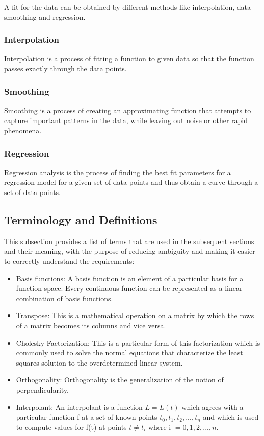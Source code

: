 \documentclass[12pt]{article}
\begin{document}
A fit for the data can be obtained by different methods like interpolation, data smoothing and regression.

\subsubsection{Interpolation}
Interpolation is a process of fitting a function to given data so that the function passes exactly through the data points.

\subsubsection{Smoothing}
Smoothing is a process of creating an approximating function that attempts to capture important patterns in the data, while leaving out noise or other rapid phenomena.

\subsubsection{Regression}
Regression analysis is the process of finding the best fit parameters for a regression model for a given set of data points and thus obtain a curve through a set of data points.

\subsection{Terminology and  Definitions}\label{Sec_Terminologies}

This subsection provides a list of terms that are used in the subsequent
sections and their meaning, with the purpose of reducing ambiguity and making it
easier to correctly understand the requirements:

\begin{itemize}

\item Basis functions: A basis function is an element of a particular basis for a function space. Every continuous function can be represented as a linear combination of basis functions.

\item Transpose: This is a mathematical operation on a matrix by which the rows of a matrix becomes its columns and vice versa.

\item Cholesky Factorization: This is a particular form of this factorization which is commonly used to solve the normal equations that characterize the least squares solution to the overdetermined linear system.

\item Orthogonality: Orthogonality is the generalization of the notion of perpendicularity.

\item Interpolant: An interpolant is a function $L=L(t)$ which agrees with a particular function f at a set of known points $t_0,t_1,t_2,...,t_n$ and which is used to compute values for f(t) at points $t \neq t_i$ where i $=0,1,2,...,n$.

\end{itemize}
\end{document}
